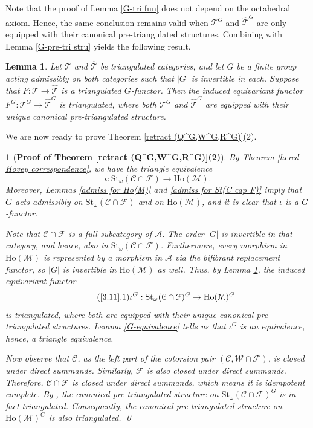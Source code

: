 \documentclass[12pt,twoside]{amsart}
\theoremstyle{bfupright head,slanted body}
\theoremstyle{bfupright head,upright body}
\newtheorem{bfhpg}[res]{}               \newtheorem*{bfhpg*}{}
\theoremstyle{fixed bf head,slanted body}
\newtheorem{lem}[res]{Lemma}            \newtheorem*{lem*}{Lemma}
\theoremstyle{fixed bf head,upright body}
\theoremstyle{numbered paragraph}
\newcommand{\thmcite}[2][?]{\cite[Theorem~#1]{#2}}
\numberwithin{equation}{res}
\newcommand{\calC}{\mathcal{C}}
\newcommand{\calW}{\mathcal{W}}
\newcommand{\calF}{\mathcal{F}}
\newcommand{\calA}{\mathcal{A}}
\newcommand{\calM}{\mathcal{M}}
\newcommand{\calT}{\mathcal{T}}
\newcommand{\Ho}{\mathrm{Ho}}
\newcommand{\St}{\mathrm{St}}
\begin{document}
Note that the proof of Lemma \ref{G-tri fun} does not depend on the octahedral axiom. Hence, the same conclusion remains valid when \(\calT^G\) and \(\widehat{\calT}^G\) are only equipped with their canonical pre-triangulated structures. Combining with Lemma \ref{G-pre-tri stru} yields the following result.

\begin{lem} \label{G-pretri fun}
Let $\calT$ and $\widehat{\calT}$ be triangulated categories, and let $G$ be a finite group acting admissibly on both categories such that $|G|$ is invertible in each.
Suppose that $F : \calT \to \widehat{\calT}$ is a triangulated $G$-functor.
Then the induced equivariant functor $F^G : \calT^G \to \widehat{\calT}^G$ is triangulated, where both $\calT^G$ and $\widehat{\calT}^G$ are equipped with their unique canonical pre-triangulated structure.
\end{lem}

We are now ready to prove Theorem \ref{retract (Q^G,W^G,R^G)}(2).

\begin{bfhpg}[\bf Proof of Theorem \ref{retract (Q^G,W^G,R^G)}(2)]\label{3.11}
By Theorem \ref{hered Hovey correspondence}, we have the triangle equivalence
\[
\iota : \St_\omega(\calC \cap \calF) \to \Ho(\calM).
\]
Moreover, Lemmas \ref{admiss for Ho(M)} and \ref{admiss for St(C cap F)} imply that $G$ acts admissibly on $\St_\omega(\calC \cap \calF)$ and on $\Ho(\calM)$, and it is clear that $\iota$ is a $G$-functor.

Note that $\calC \cap \calF$ is a full subcategory of $\calA$. The order $|G|$ is invertible in that category, and hence, also in $\St_\omega(\calC \cap \calF)$.
Furthermore, every morphism in \(\Ho(\calM)\) is represented by a morphism in \(\calA\) via the bifibrant replacement functor, so \(|G|\) is invertible in \(\Ho(\calM)\) as well.
Thus, by Lemma \ref{G-pretri fun}, the induced equivariant functor
\begin{equation*}\tag{\ref{3.11}.1}
\iota^G : \St_\omega(\calC \cap \calF)^G \to \Ho(\calM)^G
\end{equation*}
is triangulated, where both are equipped with their unique canonical pre-triangulated structures. Lemma \ref{G-equivalence} tells us that \(\iota^G\) is an equivalence, hence, a triangle equivalence.

Now observe that $\calC$, as the left part of the cotorsion pair $(\calC, \calW \cap \calF)$, is closed under direct summands.
Similarly, $\calF$ is also closed under direct summands.
Therefore, $\calC \cap \calF$ is closed under direct summands, which means it is idempotent complete.
By \thmcite[3.14]{2019Sun}, the canonical pre-triangulated structure on \(\St_\omega(\calC\cap\calF)^G\) is in fact triangulated. Consequently, the canonical pre-triangulated structure on \(\Ho(\calM)^G\) is also triangulated.
\qed
\end{bfhpg}
\end{document}
